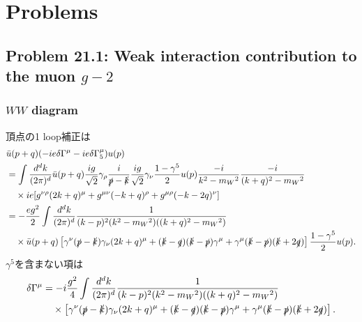 \section*{Problems}
\subsection{Problem 21.1: Weak interaction contribution to the muon \(g-2\)}
\subsubsection{\(WW\) diagram}
\begin{center}
\end{center}

頂点の1 loop補正は
\begin{align*}
  & \bar{u}(p+q) (-ie\delta\Gamma^\mu-ie\delta\Gamma_5^\mu) u(p) \\
  &= \int \frac{d^dk}{(2\pi)^d} \bar{u}(p+q) \frac{ig}{\sqrt{2}} \gamma_\rho \frac{i}{\slashed{p}-\slashed{k}} \frac{ig}{\sqrt{2}} \gamma_\nu \frac{1-\gamma^5}{2} u(p)
  \frac{-i}{k^2-m_W{}^2} \frac{-i}{(k+q)^2-m_W{}^2} \\
  &\quad\times ie [ g^{\nu\rho} (2k+q)^\mu + g^{\mu\nu} (-k+q)^\rho + g^{\mu\rho} (-k-2q)^\nu ] \\
  &= - \frac{eg^2}{2} \int \frac{d^dk}{(2\pi)^d} \frac{1}{(k-p)^2 (k^2 - m_W{}^2) ((k+q)^2 - m_W{}^2)} \\
  &\quad\times \bar{u}(p+q) \left[ \gamma^\nu(\slashed{p}-\slashed{k})\gamma_\nu(2k+q)^\mu
  + (\slashed{k}-\slashed{q}) (\slashed{k}-\slashed{p}) \gamma^\mu
  + \gamma^\mu (\slashed{k}-\slashed{p}) (\slashed{k}+2\slashed{q}) \right] \frac{1-\gamma^5}{2} u(p) .
\end{align*}
\(\gamma^5\)を含まない項は
\begin{align*}
  \delta\Gamma^\mu
  &= -i\frac{g^2}{4} \int \frac{d^dk}{(2\pi)^d} \frac{1}{(k-p)^2 (k^2 - m_W{}^2) ((k+q)^2 - m_W{}^2)} \\
  &\quad\times \left[ \gamma^\nu(\slashed{p}-\slashed{k})\gamma_\nu(2k+q)^\mu
  + (\slashed{k}-\slashed{q}) (\slashed{k}-\slashed{p}) \gamma^\mu
  + \gamma^\mu (\slashed{k}-\slashed{p}) (\slashed{k}+2\slashed{q}) \right] .
\end{align*}

